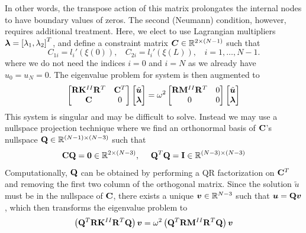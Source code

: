 In other words, the transpose action of this matrix prolongates the internal nodes to have boundary values of zeros.
The second (Neumann) condition, however, requires additional treatment. 
Here, we elect to use Lagrangian multipliers $\bm{\lambda} = {[\lambda_1, \lambda_2]}^T$, and define a constraint matrix $\bm{C} \in \mathbb{R}^{2\times(N-1)}$ such that 
\begin{equation}
    C_{1i} = l_i'(\xi(0)), ~~~~ C_{2i} = l_i'(\xi(L)), ~~~~ i = 1, \ldots, N-1.
\end{equation}
where we do not need the indices $i=0$ and $i = N$ as we already have $u_0 = u_N = 0$.
The eigenvalue problem for system  is then augmented to
\begin{equation}
    \begin{bmatrix}
        \bt{R} \bt{K}^{\Rom{2}} \bt{R}^T & \bt{C}^T \\
        \bt{C} & 0
    \end{bmatrix}
    \begin{bmatrix}
        \tilde{\bv{u}} \\ \bv{\lambda}
    \end{bmatrix} = 
    \omega^2 
    \begin{bmatrix}
        \bt{R} \bt{M}^{\Rom{2}} \bt{R}^T & 0 \\
        0 & 0
    \end{bmatrix}
    \begin{bmatrix}
        \tilde{\bv{u}} \\ \bv{\lambda}
    \end{bmatrix}
\end{equation}
This system is singular and may be difficult to solve. 
Instead we may use a nullspace projection technique where we find an orthonormal basis of $\mathbf{C}$'s nullspace $\mathbf{Q} \in \mathbb{R}^{(N-1)\times (N-3)}$ such that 
\begin{equation}
    \mathbf{C} \mathbf{Q} = \mathbf{0} \in \mathbb{R}^{2\times(N-3)}, ~~~~ \mathbf{Q}^T \mathbf{Q} = \mathbf{I} \in \mathbb{R}^{(N-3)\times(N-3)}
\end{equation}
Computationally, $\mathbf{Q}$ can be obtained by performing a QR factorization on $\mathbf{C}^T$ and removing the first two column of the orthogonal matrix. 
Since the solution $\tilde{u}$ must be in the nullspace of $\mathbf{C}$, there exists a unique $\bm{v} \in \mathbb{R}^{N-3}$ such that $\bm{u} = \mathbf{Q} \bm{v}$, which then transforms the eigenvalue problem to 
\begin{equation}
    \left( \bt{Q}^T \bt{R} \bt{K}^{\Rom{2}} \bt{R}^T \bt{Q} \right) \bv{v} = \omega^2 \left( \bt{Q}^T \bt{R} \bt{M}^{\Rom{2}} \bt{R}^T \bt{Q} \right) \bv{v}
\end{equation}

